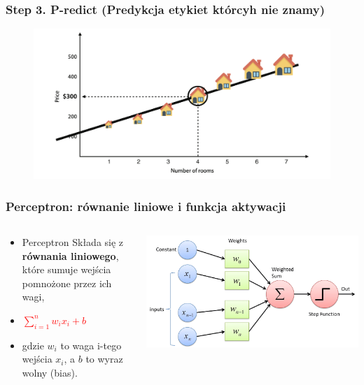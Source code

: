 \documentclass[smaller]{beamer}
\begin{document}
\begin{frame}
\frametitle{Step 3. P-redict (Predykcja etykiet którcyh nie znamy)}
\begin{figure}
    \centering
    \includegraphics[width=\textwidth,height=0.7\textheight,keepaspectratio]{../manifest/estate-predict.png}
\end{figure}
\end{frame}


\begin{frame}
\frametitle{Perceptron: równanie liniowe i funkcja aktywacji}

\begin{columns}
    \begin{column}{0.4\textwidth}
        \begin{itemize}
            \item Perceptron Składa się z \textbf{równania liniowego}, które sumuje wejścia pomnożone przez ich wagi, 
            \item \textbf{\textcolor{red}{\( \sum_{i=1}^{n} w_i x_i + b \)}}
            \item gdzie \( w_i \) to waga i-tego wejścia \( x_i \), a \( b \) to wyraz wolny (bias).
        \end{itemize}
    \end{column}

    \begin{column}{0.6\textwidth}
        \centering
        \includegraphics[width=\textwidth]{../manifest/perceptron.png} %
    \end{column}
\end{columns}

\end{frame}
\end{document}
